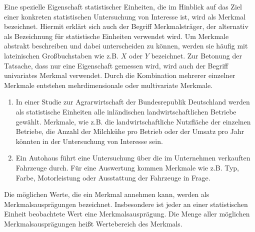 \documentclass{lecture}
\begin{document}
    Eine spezielle Eigenschaft statistischer Einheiten, die im Hinblick auf das Ziel einer konkreten statistischen Untersuchung von Interesse ist, wird als Merkmal bezeichnet.
    Hiermit erklärt sich auch der Begriff Merkmalsträger, der alternativ als Bezeichnung für statistische Einheiten verwendet wird.
    Um Merkmale abstrakt beschreiben und dabei unterscheiden zu können, werden sie häufig mit lateinischen Großbuchstaben wie z.B. \(X\) oder \(Y\) bezeichnet.
    Zur Betonung der Tatsache, dass nur eine Eigenschaft gemessen wird, wird auch der Begriff univariates Merkmal verwendet.
    Durch die Kombination mehrerer einzelner Merkmale entstehen mehrdimensionale oder multivariate Merkmale.

    \begin{example}
        \begin{enumerate}
            \item In einer Studie zur Agrarwirtschaft der Bundesrepublik Deutschland werden als statistische Einheiten alle inländischen landwirtschaftlichen Betriebe gewählt.
            Merkmale, wie z.B. die landwirtschaftliche Nutzfläche der einzelnen Betriebe, die Anzahl der Milchkühe pro Betrieb oder der Umsatz pro Jahr könnten in der Untersuchung von Interesse sein.
            \item Ein Autohaus führt eine Untersuchung über die im Unternehmen verkauften Fahrzeuge durch.
            Für eine Auswertung kommen Merkmale wie z.B. Typ, Farbe, Motorleistung oder Ausstattung der Fahrzeuge in Frage.
        \end{enumerate}
    \end{example}

    Die möglichen Werte, die ein Merkmal annehmen kann, werden als Merkmalsausprägungen bezeichnet.
    Insbesondere ist jeder an einer statistischen Einheit beobachtete Wert eine Merkmalsausprägung.
    Die Menge aller möglichen Merkmalsausprägungen heißt Wertebereich des Merkmals.
\end{document}
